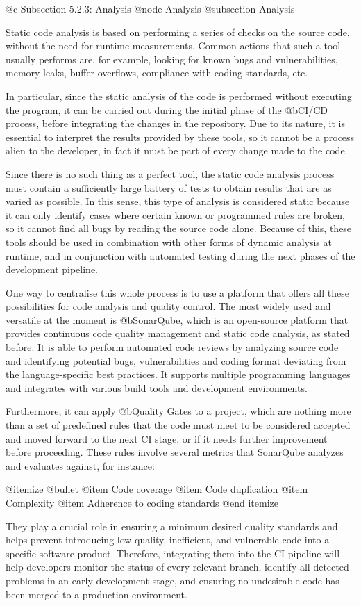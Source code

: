 @c Subsection 5.2.3: Analysis
@node Analysis
@subsection Analysis

Static code analysis is based on performing a series of checks on the source code, without the need for runtime measurements. Common actions that such a tool usually performs are, for example, looking for known bugs and vulnerabilities, memory leaks, buffer overflows, compliance with coding standards, etc.

In particular, since the static analysis of the code is performed without executing the program, it can be carried out during the initial phase of the @b{CI/CD} process, before integrating the changes in the repository. Due to its nature, it is essential to interpret the results provided by these tools, so it cannot be a process alien to the developer, in fact it must be part of every change made to the code.

Since there is no such thing as a perfect tool, the static code analysis process must contain a sufficiently large battery of tests to obtain results that are as varied as possible. In this sense, this type of analysis is considered static because it can only identify cases where certain known or programmed rules are broken, so it cannot find all bugs by reading the source code alone. Because of this, these tools should be used in combination with other forms of dynamic analysis at runtime, and in conjunction with automated testing during the next phases of the development pipeline.

One way to centralise this whole process is to use a platform that offers all these possibilities for code analysis and quality control. The most widely used and versatile at the moment is @b{SonarQube}, which is an open-source platform that provides continuous code quality management and static code analysis, as stated before. It is able to perform automated code reviews by analyzing source code and identifying potential bugs, vulnerabilities and coding format deviating from the language-specific best practices. It supports multiple programming languages and integrates with various build tools and development environments.

Furthermore, it can apply @b{Quality Gates} to a project, which are nothing more than a set of predefined rules that the code must meet to be considered accepted and moved forward to the next CI stage, or if it needs further improvement before proceeding. These rules involve several metrics that SonarQube analyzes and evaluates against, for instance:

@itemize @bullet
@item Code coverage
@item Code duplication
@item Complexity
@item Adherence to coding standards
@end itemize

They play a crucial role in ensuring a minimum desired quality standards and helps prevent introducing low-quality, inefficient, and vulnerable code into a specific software product. Therefore, integrating them into the CI pipeline will help developers monitor the status of every relevant branch, identify all detected problems in an early development stage, and ensuring no undesirable code has been merged to a production environment.
